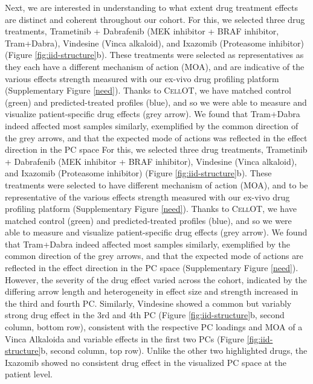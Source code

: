 Next, we are interested in understanding to what extent drug treatment effects are distinct and coherent throughout our cohort.
For this, we selected three drug treatments, Trametinib + Dabrafenib (MEK inhibitor + BRAF inhibitor, Tram+Dabra), Vindesine (Vinca alkaloid), and Ixazomib (Proteasome inhibitor) (Figure \ref{fig:iid-structure}b).
These treatments were selected as representatives as they each have a different mechanism of action (MOA), and are indicative of the various effects strength measured with our ex-vivo drug profiling platform (Supplementary Figure \ref{need}).
Thanks to \textsc{CellOT}, we have matched control (green) and predicted-treated profiles (blue), and so we were able to measure and visualize patient-specific drug effects (grey arrow).
 We found that Tram+Dabra indeed affected most samples similarly, exemplified by the common direction of the grey arrows, and that the expected mode of actions was reflected in the effect direction in the PC space 
 For this, we selected three drug treatments, Trametinib + Dabrafenib (MEK inhibitor + BRAF inhibitor), Vindesine (Vinca alkaloid), and Ixazomib (Proteasome inhibitor) (Figure \ref{fig:iid-structure}b).
 These treatments were selected to have different mechanism of action (MOA), and to be representative of the various effects strength measured with our ex-vivo drug profiling platform (Supplementary Figure \ref{need}).
Thanks to \textsc{CellOT}, we have matched control (green) and predicted-treated profiles (blue), and so we were able to measure and visualize patient-specific drug effects (grey arrow).
 We found that Tram+Dabra indeed affected most samples similarly, exemplified by the common direction of the grey arrows, and that the expected mode of actions \cite{subbiah2020} are reflected in the effect direction in the PC space (Supplementary Figure \ref{need}).
 However, the severity of the drug effect varied across the cohort, indicated by the differing arrow length and heterogeneity in effect size and strength increased in the third and fourth PC.
 Similarly, Vindesine showed a common but variably strong drug effect in the 3rd and 4th PC (Figure \ref{fig:iid-structure}b, second column, bottom row), consistent with the respective PC loadings and MOA of a Vinca Alkaloida \cite{dhyani2022} and variable effects in the first two PCs (Figure \ref{fig:iid-structure}b, second column, top row).
 Unlike the other two highlighted drugs, the Ixazomib showed no consistent drug effect in the visualized PC space at the patient level.  

